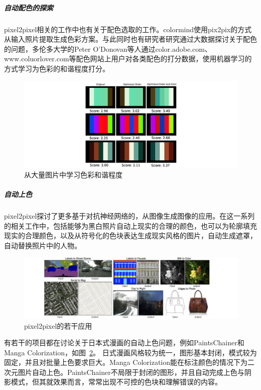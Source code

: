 \subparagraph{自动配色的探索}pixel2pixel相关的工作中也有关于配色选取的工作。colormind使用pix2pix的方式从输入照片提取生成色彩方案。\cite{pix2pix2016}\cite{chen2015improved}与此同时也有研究者研究通过大数据探讨关于配色的问题，多伦多大学的Peter O'Donovan等人通过color.adobe.com、www.coluorlover.com等配色网站上用户对各类配色的打分数据，使用机器学习的方式学习为色彩的和谐程度打分。\cite{O'Donovan:2011:CCL:2010324.1964958}

\begin{figure}[!htbp]
\centering
\includegraphics[width=\linewidth,keepaspectratio]{data/chapter-1/Color Compatibility.png}
\caption{从大量图片中学习色彩和谐程度}
\label{figure:Color Compatibility}
\end{figure}


\subparagraph{自动上色}

pixel2pixel探讨了更多基于对抗神经网络的，从图像生成图像的应用。在这一系列的相关工作中，包括能够为黑白照片自动上现实的合理的颜色，也可以为轮廓填充现实的合理颜色，以及从符号化的色块表达生成现实风格的图片，自动生成遮罩，自动替换照片中的人物。\cite{deng2010binary}

\begin{figure}[!htbp]
\centering
\includegraphics[width=\linewidth,keepaspectratio]{data/chapter-1/pix2pix.jpg}
\caption{pixel2pixel的若干应用}
\label{figure:Manga Colorization}
\end{figure}

有若干的项目都在讨论关于日本式漫画的自动上色问题，例如PaintsChainer和 Manga Colorization，如图~\ref{figure:Manga Colorization}。\cite{Qu:2006:MC:1141911.1142017} \cite{DBLP:journals/corr/ZhangJL17} 日式漫画风格较为统一，图形基本封闭，模式较为固定，并且对批量上色要求巨大。Manga Colorization能在标注颜色的情况下为二次元图片自动上色。PaintsChainer不局限于封闭的图形，并且自动完成上色与阴影模式，但其就效果而言，常常出现不可控的色块和理解错误的内容。

